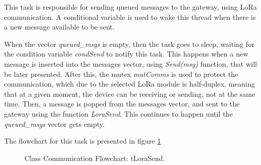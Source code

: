 %
%


This task is responsible for sending queued messages to the gateway, using LoRa communication. A conditional variable is used to wake this thread when there is a new message available to be sent.

When the vector \textit{queued\_msgs} is empty, then the task goes to sleep, waiting for the condition variable \textit{condSend} to notify this task. This happens when a new message is inserted into the messages vector, using \textit{Send(msg)} function, that will be later presented. After this, the mutex \textit{mutComms} is used to protect the communication, which due to the selected LoRa module is half-duplex, meaning that at a given moment, the device can be receiving or sending, not at the same time. Then, a message is popped from the messages vector, and sent to the gateway using the function \textit{LoraSend}. This continues to happen until the \textit{queued\_msgs} vector gets empty.

The flowchart for this task is presented in figure \ref{fig:flow_tlorasend}

\begin{figure}[H]
	\caption{Class Communication Flowchart: tLoraSend.}
	\label{fig:flow_tlorasend}
\end{figure}



